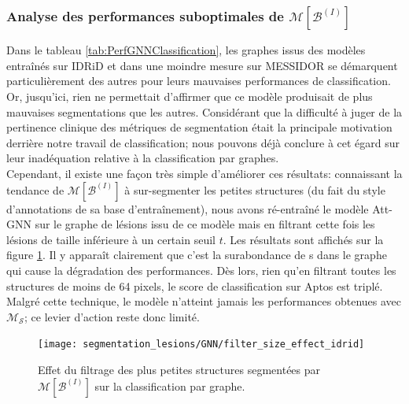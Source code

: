 \subsubsection{Analyse des performances suboptimales de $\mathcal{M}[\mathcal{B}^{(I)}]$} 
Dans le tableau \ref{tab:PerfGNNClassification}, les graphes issus des modèles entraînés sur \ac{IDRiD} et dans une moindre mesure sur MESSIDOR se démarquent particulièrement des autres pour leurs mauvaises performances de classification. Or, jusqu'ici, rien ne permettait d'affirmer que ce modèle produisait de plus mauvaises segmentations que les autres. Considérant que la difficulté à juger de la pertinence clinique des métriques de segmentation était la principale motivation derrière notre travail de classification; nous pouvons déjà conclure à cet égard sur leur inadéquation relative à la classification par graphes. \\
Cependant, il existe une façon très simple d'améliorer ces résultats: connaissant la tendance de $\mathcal{M}[\mathcal{B}^{(I)}]$ à sur-segmenter les petites structures (du fait du style d'annotations de sa base d'entraînement), nous avons ré-entraîné le modèle Att-GNN sur le graphe de lésions issu de ce modèle mais en filtrant cette fois les lésions de taille inférieure à un certain seuil $t$. Les résultats sont affichés sur la figure \ref{fig:SizeFilteringLesionGNN}. Il y apparaît clairement que c'est la surabondance de \noeud{}s dans le graphe qui cause la dégradation des performances. Dès lors, rien qu'en filtrant toutes les structures de moins de 64 pixels, le score de classification sur Aptos est triplé. Malgré cette technique, le modèle n'atteint jamais les performances obtenues avec $\mathcal{M}_\mathcal{S}$; ce levier d'action reste donc limité.
\begin{figure}
	\centering
	\texttt{[image: segmentation\_lesions/GNN/filter\_size\_effect\_idrid]}
	\caption{Effet du filtrage des plus petites structures segmentées par $\mathcal{M}[\mathcal{B}^{(I)}]$ sur la classification par graphe.}
	\label{fig:SizeFilteringLesionGNN}
\end{figure}
